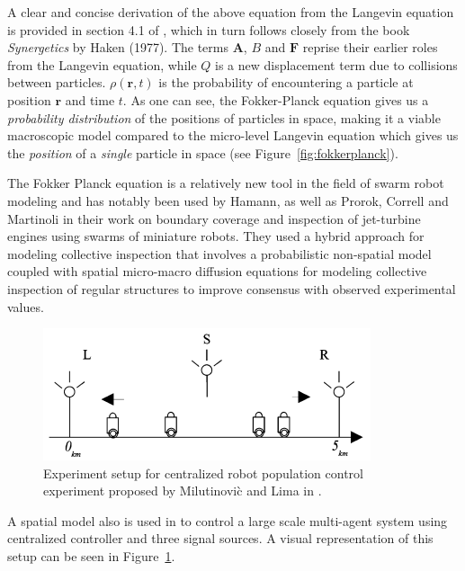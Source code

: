 \documentclass[11pt, onecolumn, compsoc, letterpaper]{article}
\newcommand{\V}[1]{\mathbf{#1}}
\begin{document}
A clear and concise derivation of the above equation from the Langevin equation is provided in section 4.1 of \cite{Hamann2010}, which in turn follows closely from the book \emph{Synergetics} by Haken (1977). The terms $\V{A}$, $B$ and $\V{F}$ reprise their earlier roles from the Langevin equation, while $Q$ is a new displacement term due to collisions between particles. $\rho(\V{r}, t)$ is the probability of encountering a particle at position $\V{r}$ and time $t$. As one can see, the Fokker-Planck equation gives us a \emph{probability distribution} of the positions of particles in space, making it a viable macroscopic model compared to the micro-level Langevin equation which gives us the \emph{position} of a \emph{single} particle in space (see Figure~\ref{fig:fokkerplanck}).

The Fokker Planck equation is a relatively new tool in the field of swarm robot modeling and has notably been used by Hamann\cite{Hamann2008,Hamann2010}, as well as Prorok, Correll and Martinoli\cite{Prorok2011} in their work on boundary coverage and inspection of jet-turbine engines using swarms of miniature robots. They used a hybrid approach for modeling collective inspection that involves a probabilistic non-spatial model coupled with spatial micro-macro diffusion equations for modeling collective inspection of regular structures to improve consensus with observed experimental values. 

\begin{figure}[!htb]
\centering\includegraphics[width=.75\textwidth]{../assets/spatSignal.png}
\centering\caption{Experiment setup for centralized robot population control experiment proposed by Milutinovi\`{c} and Lima in%
.}\label{fig:signal}
\end{figure}

A spatial model also is used in\cite{Milutinovi2006} to control a large scale multi-agent system using centralized controller and three signal sources. A visual representation of this setup can be seen in Figure~\ref{fig:signal}.
\end{document}
